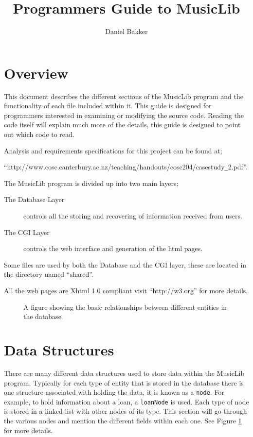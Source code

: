 \documentclass{article}
\title{Programmers Guide to MusicLib}
\author{Daniel Bakker}
\begin{document}
\maketitle
\newpage
\tableofcontents
\newpage
\section{Overview}
This document describes the different sections of the MusicLib program and the functionality of each file included within it. This guide is designed for programmers interested in examining or modifying the source code. Reading the code itself will explain much more of the details, this guide is designed to point out which code to read.

Analysis and requirements specifications for this project can be found at;

``http://www.cosc.canterbury.ac.nz/teaching/handouts/cosc204/casestudy\verb|_|2.pdf''.


The MusicLib program is divided up into two main layers;
\begin{description} 
\item[The Database Layer] controls all the storing and recovering of information received from users.
\item[The CGI Layer] controls the web interface and generation of the html pages.
\end{description}

Some files are used by both the Database and the CGI layer, these are located in the directory named ``shared''.

All the web pages are Xhtml 1.0 compliant visit ``http://w3.org'' for more details.
\begin{figure}
\begin{center}
\caption{A figure showing the basic relationships between different entities in the database.}
\label{Fig1}
\end{center}
\end{figure}
\section{Data Structures}
There are many different data structures used to store data within the MusicLib program. Typically for each type of entity that is stored in the database there is one structure associated with holding the data, it is known as a \verb|node|. For example, to hold information about a loan, a \verb|loanNode| is used.
Each type of node is stored in a linked list with other nodes of its type. This section will go through the various nodes and mention the different fields within each one. See Figure \ref{Fig1} for more details.
\end{document}
